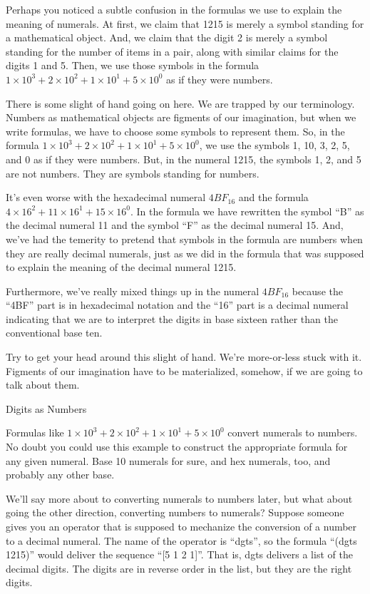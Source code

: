 \begin{aside}
Perhaps you noticed a subtle confusion in the formulas we use
to explain the meaning of numerals. At first, we claim that
1215 is merely a symbol standing for a mathematical object.
And, we claim that the digit 2 is merely a symbol standing
for the number of items in a pair, along with similar
claims for the digits 1 and 5. Then, we use those symbols
in the formula $1 \times 10^3 + 2 \times 10^2 + 1 \times 10^1 + 5 \times 10^0$
as if they were numbers.

There is some slight of hand going on here.
We are trapped by our terminology.
Numbers as mathematical objects are figments of our imagination,
but when we write formulas, we have to choose some symbols to
represent them.
So, in the formula $1 \times 10^3 + 2 \times 10^2 + 1 \times 10^1 + 5 \times 10^0$,
we use the symbols 1, 10, 3, 2, 5, and 0 as if they were numbers.
But, in the numeral 1215, the symbols 1, 2, and 5 are not numbers.
They are symbols standing for numbers.

It's even worse with the hexadecimal numeral $4BF_{16}$
and the formula $4 \times 16^2 + 11 \times 16^1 + 15 \times 16^0$.
In the formula we have rewritten the symbol ``B'' as the decimal numeral 11
and the symbol ``F'' as the decimal numeral 15.
And, we've had the temerity to pretend that symbols
in the formula are numbers when they are really decimal numerals,
just as we did in the formula that was supposed to explain
the meaning of the decimal numeral 1215.

Furthermore, we've really mixed things up in the numeral
$4BF_{16}$ because the ``4BF'' part is in hexadecimal notation
and the ``16'' part is a decimal numeral indicating that we are
to interpret the digits in base sixteen rather than the conventional base ten.

Try to get your head around this slight of hand.
We're more-or-less stuck with it. Figments of our imagination have
to be materialized, somehow, if we are going to talk about them.
\caption{Digits as Numbers}
\label{aside-digits-as-numbers}
\end{aside}


Formulas like $1 \times 10^3 + 2 \times 10^2 + 1 \times 10^1 + 5 \times 10^0$
convert numerals to numbers.
No doubt you could use this example to construct the appropriate formula
for any given numeral. Base 10 numerals for sure, and hex numerals, too,
and probably any other base.

We'll say more about to converting numerals to numbers later,
but what about going the other direction, converting
numbers to numerals?
Suppose someone gives you an operator that is supposed to
mechanize the conversion of a number to a decimal numeral.
The name of the operator is ``dgts'', so the formula
``(dgts 1215)'' would deliver the sequence ``[5 1 2 1]''.
That is, dgts delivers a list of the decimal digits.
The digits are in reverse order in the list,
but they are the right digits.

